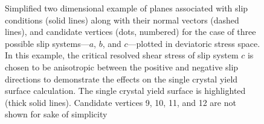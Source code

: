 \documentclass[preprint,3p,times,sort&compress,letterpaper,12pt]{elsarticle} %
\begin{document}
\begin{figure}[H]
{
    }
    \caption{Simplified two dimensional example of planes associated with slip conditions (solid lines) along with their normal vectors (dashed lines), and candidate vertices (dots, numbered) for the case of three possible slip systems---$a$, $b$, and $c$---plotted in deviatoric stress space. In this example, the critical resolved shear stress of slip system $c$ is chosen to be anisotropic between the positive and negative slip directions to demonstrate the effects on the single crystal yield surface calculation. The single crystal yield surface is highlighted (thick solid lines). Candidate vertices 9, 10, 11, and 12 are not shown for sake of simplicity}
    \label{fig:2dys_5}
\end{figure}
\end{document}
